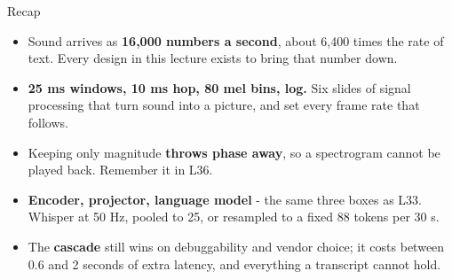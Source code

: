 \documentclass[aspectratio=169]{beamer}
\begin{document}
\begin{frame}{Recap}
  \small
  \begin{itemize}\itemsep4pt
    \item Sound arrives as \textbf{16,000 numbers a second}, about 6,400 times the rate of text.
      Every design in this lecture exists to bring that number down.
    \item \textbf{25 ms windows, 10 ms hop, 80 mel bins, log.} Six slides of signal processing
      that turn sound into a picture, and set every frame rate that follows.
    \item Keeping only magnitude \textbf{throws phase away}, so a spectrogram cannot be played
      back. Remember it in L36.
    \item \textbf{Encoder, projector, language model} - the same three boxes as L33. Whisper at
      50 Hz, pooled to 25, or resampled to a fixed 88 tokens per 30 s.
    \item The \textbf{cascade} still wins on debuggability and vendor choice; it costs between
      0.6 and 2 seconds of extra latency, and everything a transcript cannot hold.
  \end{itemize}
  \vskip 8pt
\end{frame}
\end{document}
